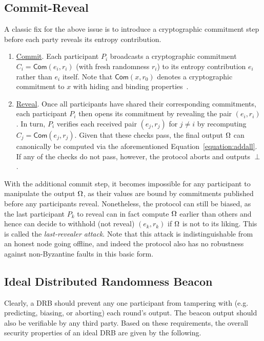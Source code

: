 \subsection{Commit-Reveal}
\label{subsection:commit-reveal}
A classic fix for the above issue is to introduce a cryptographic commitment step before each party reveals its entropy contribution.
\begin{enumerate}
\item \underline{Commit}. Each participant $P_i$ broadcasts a cryptographic commitment $C_i = \mathsf{Com}(e_i, r_i)$ (with fresh randomness $r_i$) to its entropy contribution $e_i$ rather than $e_i$ itself. Note that $\mathsf{Com}(x, r_0)$ denotes a cryptographic commitment to $x$ with hiding and binding properties~\cite{blum1983coin,damgaard1998commitment}.
\item \underline{Reveal}. Once all participants have shared their corresponding commitments, each participant $P_i$ then opens its commitment by revealing the pair $(e_i, r_i)$. In turn, $P_i$ verifies each received pair $(e_j, r_j)$ for $j \neq i$ by recomputing $C_j = \mathsf{Com}(e_j, r_j)$. Given that these checks pass, the final output $\Omega$ can canonically be computed via the aforementioned Equation~\ref{equation:addall}. If any of the checks do not pass, however, the protocol aborts and outputs $\perp$.
\end{enumerate}

With the additional commit step, it becomes impossible for any participant to manipulate the output $\Omega$, as their values are bound by commitments published before any participants reveal. Nonetheless, the protocol can still be biased, as the last participant $P_k$ to reveal can in fact compute $\Omega$ earlier than others and hence can decide to withhold (not reveal) $(e_k, r_k)$ if $\Omega$ is not to its liking. This is called the \textit{last-revealer attack}. Note that this attack is indistinguishable from an honest node going offline, and indeed the protocol also has no robustness against non-Byzantine faults in this basic form.

\subsection{Ideal Distributed Randomness Beacon}
Clearly, a DRB should prevent any one participant from tampering with (e.g. predicting, biasing, or aborting) each round's output. The beacon output should also be verifiable by any third party. Based on these requirements, the overall security properties of an ideal DRB are given by the following.

